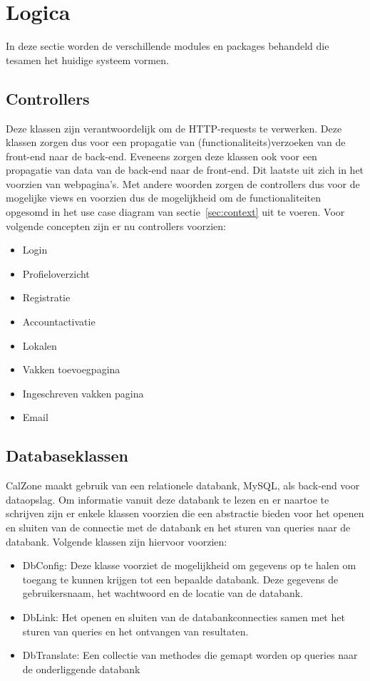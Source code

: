 \section{Logica}
\label{sec:logica}

In deze sectie worden de verschillende modules en packages behandeld die tesamen het huidige systeem vormen.

\subsection{Controllers}
\label{subsec:controllers}

Deze klassen zijn verantwoordelijk om de HTTP-requests te verwerken. 
Deze klassen zorgen dus voor een propagatie van (functionaliteits)verzoeken van de front-end naar de back-end. 
Eveneens zorgen deze klassen ook voor een propagatie van data van de back-end naar de front-end. 
Dit laatste uit zich in het voorzien van webpagina's.
Met andere woorden zorgen de controllers dus voor de mogelijke views en voorzien dus de mogelijkheid om de functionaliteiten opgesomd in het use case diagram van sectie~\ref{sec:context} uit te voeren. 
Voor volgende concepten zijn er nu controllers voorzien:

\begin{itemize}
	\item Login
	\item Profieloverzicht
	\item Registratie
	\item Accountactivatie
	\item Lokalen
	\item Vakken toevoegpagina
	\item Ingeschreven vakken pagina
	\item Email
\end{itemize}

\subsection{Databaseklassen}
\label{subsec:databaseklassen}

CalZone maakt gebruik van een relationele databank, MySQL, als back-end voor dataopslag. 
Om informatie vanuit deze databank te lezen en er naartoe te schrijven zijn er enkele klassen voorzien die een abstractie bieden voor het openen en sluiten van de connectie met de databank en het sturen van queries naar de databank. 
Volgende klassen zijn hiervoor voorzien:

\begin{itemize}
	\item DbConfig: Deze klasse voorziet de mogelijkheid om gegevens op te halen om toegang te kunnen krijgen tot een bepaalde databank. 
	Deze gegevens de gebruikersnaam, het wachtwoord en de locatie van de databank. 
	\item DbLink: Het openen en sluiten van de databankconnecties samen met het sturen van queries en het ontvangen van resultaten.
	\item DbTranslate: Een collectie van methodes die gemapt worden op queries naar de onderliggende databank
\end{itemize} 

